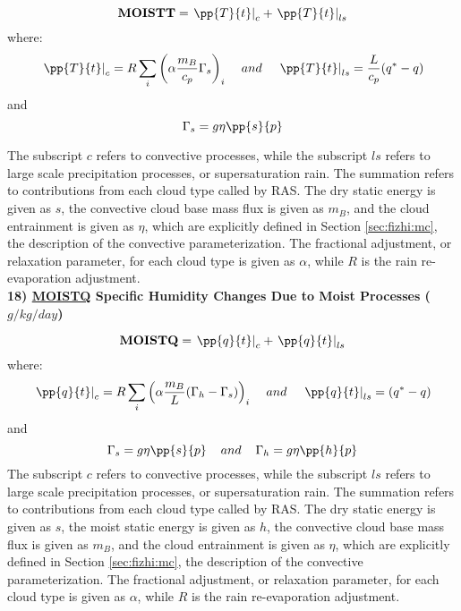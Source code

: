 \noindent
\[
{\bf MOISTT} = \left. {\pp{T}{t}}\right|_{c} + \left. {\pp{T}{t}} \right|_{ls}
\]
where:
\[
\left.{\pp{T}{t}}\right|_{c} = R \sum_i \left( \alpha { m_B \over c_p} \Gamma_s \right)_i 
\hspace{.4cm} and 
\hspace{.4cm} \left.{\pp{T}{t}}\right|_{ls} = {L \over c_p } (q^*-q)
\]
and
\[
\Gamma_s = g \eta \pp{s}{p}
\]

\noindent
The subscript $c$ refers to convective processes, while the subscript $ls$ refers to large scale
precipitation processes, or supersaturation rain. 
The summation refers to contributions from each cloud type called by RAS.  
The dry static energy is given 
as $s$, the convective cloud base mass flux is given as $m_B$, and the cloud entrainment is
given as $\eta$, which are explicitly defined in Section \ref{sec:fizhi:mc}, 
the description of the convective parameterization.  The fractional adjustment, or relaxation
parameter, for each cloud type is given as $\alpha$, while
$R$ is the rain re-evaporation adjustment.
\\

\noindent
{\bf 18)  \underline {MOISTQ} Specific Humidity Changes Due to Moist Processes ($g/kg/day$) } 

\noindent
\[
{\bf MOISTQ} = \left. {\pp{q}{t}}\right|_{c} + \left. {\pp{q}{t}} \right|_{ls}
\]
where:
\[
\left.{\pp{q}{t}}\right|_{c} = R \sum_i \left( \alpha { m_B \over {L}}(\Gamma_h-\Gamma_s) \right)_i 
\hspace{.4cm} and 
\hspace{.4cm} \left.{\pp{q}{t}}\right|_{ls} = (q^*-q)
\]
and
\[
\Gamma_s = g \eta \pp{s}{p}\hspace{.4cm} and \hspace{.4cm}\Gamma_h = g \eta \pp{h}{p}
\]
\noindent
The subscript $c$ refers to convective processes, while the subscript $ls$ refers to large scale
precipitation processes, or supersaturation rain. 
The summation refers to contributions from each cloud type called by RAS.  
The dry static energy is given as $s$, 
the moist static energy is given as $h$, 
the convective cloud base mass flux is given as $m_B$, and the cloud entrainment is
given as $\eta$, which are explicitly defined in Section \ref{sec:fizhi:mc}, 
the description of the convective parameterization.  The fractional adjustment, or relaxation
parameter, for each cloud type is given as $\alpha$, while
$R$ is the rain re-evaporation adjustment.
\\

